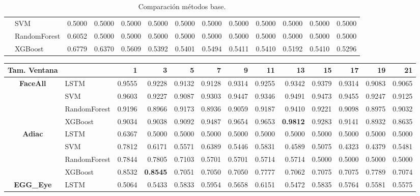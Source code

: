 \begin{table}[h]
\begin{adjustbox}{max width=15cm}
\begin{tabular}{|c|l|r|r|r|r|r|r|r|r|r|r|r|}
	& SVM &  0.5000 &  0.5000 &  0.5000 &  0.5000 &  0.5000 &  0.5000 &  0.5000 &  0.5000 &  0.5000 &  0.5000 &  0.5000 \\
	& RandomForest &  0.6052 &  0.5000 &  0.5000 &  0.5000 &  0.5000 &  0.5000 &  0.5000 &  0.5000 &  0.5000 &  0.5000 &  0.5000 \\
	& XGBoost &  0.6779 &  0.6370 &  0.5609 &  0.5392 &  0.5401 &  0.5494 &  0.5411 &  0.5410 &  0.5192 &  0.5410 &  0.5296 \\
	\hline
\end{tabular}
\end{adjustbox}
\caption{Comparación métodos base.}
\label{tab:all_comp_base}
\end{table}
\newpage
\begin{table}[h]
\centering
\begin{adjustbox}{max width=15cm}
\begin{tabular}{|c|l|r|r|r|r|r|r|r|r|r|r|r|}
	\hline
	\textbf{Tam. Ventana}&         &      1  &      3  &      5  &      7  &      9  &      11 &      13 &      15 &      17 &      19 &      21 \\
	\hline
	\textbf{FaceAll} & LSTM &  0.9555 &  0.9228 &  0.9132 &  0.9128 &  0.9314 &  0.9255 &  0.9342 &  0.9379 &  0.9314 &  0.9083 &  0.9065 \\
	& SVM &  0.9603 &  0.9227 &  0.9087 &  0.9303 &  0.9447 &  0.9346 &  0.9491 &  0.9473 &  0.9455 &  0.9247 &  0.9125 \\
	& RandomForest &  0.9196 &  0.8966 &  0.9173 &  0.8936 &  0.9059 &  0.9187 &  0.9410 &  0.9221 &  0.9098 &  0.8975 &  0.9032 \\
	& XGBoost &  0.9034 &  0.9038 &  0.9092 &  0.9487 &  0.9654 &  0.9653 &  \textbf{0.9812} &  0.9283 &  0.9141 &  0.8932 &  0.8635 \\
	\hline
	\textbf{Adiac} & LSTM &  0.6367 &  0.5000 &  0.5000 &  0.5000 &  0.5000 &  0.5000 &  0.5000 &  0.5000 &  0.5000 &  0.5000 &  0.5000 \\
	& SVM &  0.7812 &  0.6171 &  0.5571 &  0.6389 &  0.5446 &  0.5831 &  0.4589 &  0.5075 &  0.4323 &  0.4379 &  0.5481 \\
	& RandomForest &  0.7844 &  0.7805 &  0.7103 &  0.5701 &  0.5701 &  0.5714 &  0.5714 &  0.5000 &  0.5000 &  0.5000 &  0.5000 \\
	& XGBoost &  0.8532 &  \textbf{0.8545} &  0.7051 &  0.7050 &  0.7050 &  0.7777 &  0.7062 &  0.7075 &  0.7075 &  0.7789 &  0.7074 \\
	\hline
	\textbf{EGG\_Eye} & LSTM &  0.5064 &  0.5433 &  0.5833 &  0.5954 &  0.5658 &  0.6151 &  0.5472 &  0.5835 &  0.5764 &  0.5581 &  0.5575 \\

\end{tabular}
\end{adjustbox}
\end{table}
